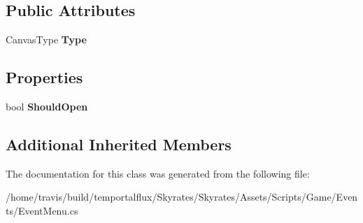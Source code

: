 \subsection*{Public Attributes}
\begin{DoxyCompactItemize}
\item 
\hypertarget{class_skyrates_1_1_game_1_1_event_1_1_event_menu_a543a2bffc6c2c735a41a788c00f2571d}{Canvas\-Type {\bfseries Type}}\label{class_skyrates_1_1_game_1_1_event_1_1_event_menu_a543a2bffc6c2c735a41a788c00f2571d}

\end{DoxyCompactItemize}
\subsection*{Properties}
\begin{DoxyCompactItemize}
\item 
\hypertarget{class_skyrates_1_1_game_1_1_event_1_1_event_menu_a5c1178466b16b6e250ca5a846a168ed0}{bool {\bfseries Should\-Open}}\label{class_skyrates_1_1_game_1_1_event_1_1_event_menu_a5c1178466b16b6e250ca5a846a168ed0}

\end{DoxyCompactItemize}
\subsection*{Additional Inherited Members}


The documentation for this class was generated from the following file\-:\begin{DoxyCompactItemize}
\item 
/home/travis/build/temportalflux/\-Skyrates/\-Skyrates/\-Assets/\-Scripts/\-Game/\-Events/Event\-Menu.\-cs\end{DoxyCompactItemize}
